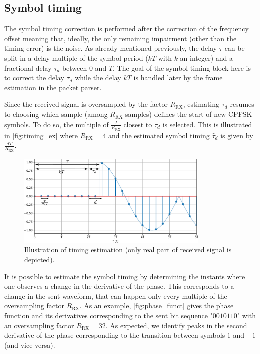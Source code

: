 \subsection{Symbol timing}
The symbol timing correction is performed after the correction of the frequency offset meaning that, ideally, the only remaining impairment (other than the timing error) is the noise. As already mentioned previously, the delay $\tau$ can be split in a delay multiple of the symbol period ($kT$ with $k$ an integer) and a fractional delay $\tau_d$ between 0 and $T$. The goal of the symbol timing block here is to correct the delay $\tau_d$ while the delay $kT$ is handled later by the frame estimation in the packet parser.

Since the received signal is oversampled by the factor $R_{\text{RX}}$, estimating $\tau_d$ resumes to choosing which sample (among $R_{\text{RX}}$ samples) defines the start of new CPFSK symbols. To do so, the multiple of $\frac{T}{R_{\text{RX}}}$
closest to $\tau_d$ is selected. This is illustrated in \autoref{fig:timing_ex} where $R_{\text{RX}}=4$ and the estimated symbol timing $\hat{\tau}_d$ is given by $\frac{dT}{R_{\text{RX}}}$.

\begin{figure}[H]
    \centering
    \includegraphics[width=0.82\textwidth]{figures/drawing_timing.pdf}
    \caption{Illustration of timing estimation (only real part of received signal is depicted).}
    \label{fig:timing_ex}
\end{figure}

It is possible to estimate the symbol timing by determining the instants where one observes a change in the derivative of the phase. This corresponds to a change in the sent waveform, that can happen only every multiple of the oversampling factor $R_{\text{RX}}$. As an example, \autoref{fig:phase_funct} gives the phase function and its derivatives corresponding to the sent bit sequence "$0010110$" with an oversampling factor $R_{\text{RX}}=32$. As expected, we identify peaks in the second derivative of the phase corresponding to the transition between symbols $1$ and $-1$ (and vice-versa).


